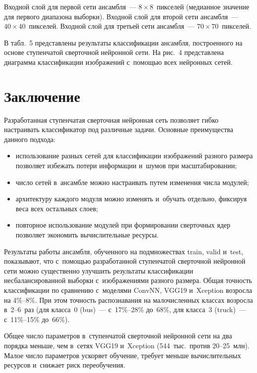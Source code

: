\begin{multicols}{2}
  Входной слой для первой сети ан\-самб\-ля~--- $8\times8$~пикселей (медианное 
значение для первого диапазона выборки). Входной слой для второй сети 
ан\-самб\-ля~--- $40\times40$~пикселей. Входной слой для третьей сети 
ан\-самб\-ля~--- $70\times70$~пикселей.
  
  В табл.~5 представлены результаты классификации ан\-самб\-ля, по\-стро\-ен\-но\-го 
на основе ступенчатой
сверточной нейронной сети. На рис.~4 пред\-став\-ле\-на 
диаграмма классификации изображений с~по\-мощью всех нейронных сетей.
  
  
\vspace*{-6pt}

\section{Заключение}

  Разработанная ступенчатая сверточная нейронная сеть поз\-во\-ля\-ет гиб\-ко 
настраивать классификатор под различные задачи. Основные преимущества 
данного подхода:
  \begin{itemize}
  \item использование разных сетей для классификации изображений разного 
размера позволяет избежать потери информации и~шумов при 
масштабировании;
  \item число сетей в~ан\-самб\-ле можно настраивать путем изменения чис\-ла 
модулей;
  \item архитектуру каждого модуля можно изменять и~\mbox{обучать} отдельно, 
фиксируя веса всех остальных слоев;
  \item повторное использование модулей при формировании сверточных ядер 
позволяет экономить вы\-чис\-ли\-тель\-ные ресурсы.
  \end{itemize}
  
  Результаты работы ан\-самб\-ля, обучен\-но\-го на подмножествах train, valid и~test, 
показывают, что с~по\-мощью разработанной ступенчатой сверточной нейронной 
сети можно существенно улучшить результаты классификации 
несбалансированной выборки с~изображениями разного размера. Общая 
точ\-ность классификации по срав\-не\-нию с~моделями ConvNN, VGG19 и~Xception 
воз\-рос\-ла на 4\%--8\%. При этом точ\-ность распознавания на ма\-ло\-чис\-лен\-ных 
классах возросла в~2--6~раз (для класса~0 (bus)~--- с~17\%--28\% до~68\%, для 
класса~3 (truck)~--- с~11\%--15\% до~66\%).
  
   Общее число па\-ра\-мет\-ров в~ступенчатой сверточной нейронной сети на два 
порядка меньше, чем в~сетях VGG19 и~Xception (544~тыс.\ против  
20--25~млн). Малое чис\-ло па\-ра\-мет\-ров ускоряет обуче\-ние, требует 
меньше вы\-чис\-ли\-тель\-ных ресурсов и~снижает риск пе\-ре\-обуче\-ния.


\end{multicols}
